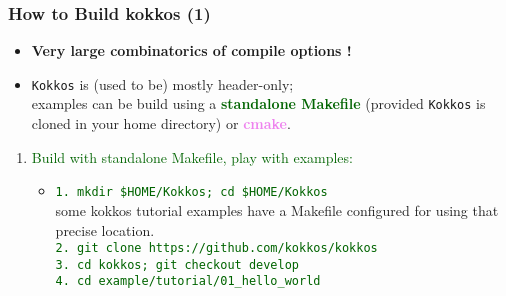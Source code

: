 \begin{frame}
  \frametitle{How to Build kokkos (1)}

  \hypertarget{handson0}{}
  \begin{itemize}
  \item {\bf Very large combinatorics of compile options !}
  \item {\tt Kokkos} is (used to be) mostly header-only;\\
     examples can be build using a \textcolor{darkgreen}{\bf standalone Makefile} (provided {\tt Kokkos} is cloned in your home directory) or \textcolor{violet}{\bf cmake}.
  \end{itemize}

  \begin{enumerate}
  \item \textcolor{darkgreen}{Build with standalone Makefile, play with examples:}
     \begin{itemize}
     \item
        \textcolor{darkgreen}{\tt 1. mkdir \$HOME/Kokkos; cd \$HOME/Kokkos}\\
        some kokkos tutorial examples have a Makefile configured for using that precise location.\\
        \textcolor{darkgreen}{\tt 2. git clone https://github.com/kokkos/kokkos}\\
        \textcolor{darkgreen}{\tt 3. cd kokkos; git checkout develop}\\
        \textcolor{darkgreen}{\tt 4. cd example/tutorial/01\_hello\_world}
     \end{itemize}
  \end{enumerate}

\end{frame}

